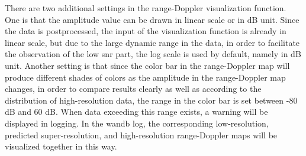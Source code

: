 There are two additional settings in the range-Doppler visualization function. One is that the amplitude value can be drawn in linear scale or in dB unit. Since the data is postprocessed, the input of the visualization function is already in linear scale, but due to the large dynamic range in the data, in order to facilitate the observation of the low \gls{snr} part, the log scale is used by default, namely in dB unit. Another setting is that since the color bar in the range-Doppler map will produce different shades of colors as the amplitude in the range-Doppler map changes, in order to compare results clearly as well as according to the distribution of high-resolution data, the range in the color bar is set between -80 dB and 60 dB. When data exceeding this range exists, a warning will be displayed in logging. In the \gls{wandb} log, the corresponding low-resolution, predicted super-resolution, and high-resolution range-Doppler maps will be visualized together in this way.